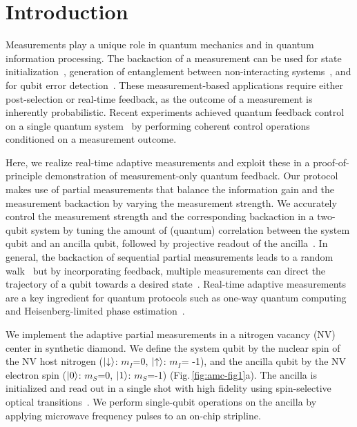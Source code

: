 \section{Introduction}
Measurements play a unique role in quantum mechanics and in quantum information processing. The backaction of a measurement can be used for state initialization~\cite{Robledo_Nature_2011,Riste_PRL_2012}, generation of entanglement between non-interacting systems~\cite{Chou_Nature_2005,Moehring_Nature_2007,Pfaff_NatPhys_2012,Riste_Nature_2013}, and for qubit error detection~\cite{Chiaverini_Nature_2004}. These measurement-based applications require either post-selection or real-time feedback, as the outcome of a measurement is inherently probabilistic. Recent experiments achieved quantum feedback control on a single quantum system~\cite{Riste_Nature_2013, Gillett_PRL_2010,Sayrin_Nature_2011,Vijay_Nature_2012} by performing coherent control operations conditioned on a measurement outcome.

Here, we realize real-time adaptive measurements and exploit these in a proof-of-principle demonstration of measurement-only quantum feedback. Our protocol makes use of partial measurements that balance the information gain and the measurement backaction by varying the measurement strength. We accurately control the measurement strength and the corresponding backaction in a two-qubit system by tuning the amount of (quantum) correlation between the system qubit and an ancilla qubit, followed by projective readout of the ancilla~\cite{Brun_PhysRevA_2008,Groen_PRL_2013}. In general, the backaction of sequential partial measurements leads to a random walk~\cite{Guerlin_Nature_2007,Hatridge_Science_2013,Murch_Nature_2013} but by incorporating feedback, multiple measurements can direct the trajectory of a qubit towards a desired state~\cite{Ashhab_PhysRevA_2010,Wiseman_NatureNV_2011}. Real-time adaptive measurements are a key ingredient for quantum protocols such as one-way quantum computing~\cite{Raussendorf_PRL_2001,Prevedel_Nature_2007} and Heisenberg-limited phase estimation~\cite{Cappellaro_PhysRevA_2012,Higgins_Nature_2007}.

We implement the adaptive partial measurements in a nitrogen vacancy (NV) center in synthetic diamond. We define the system qubit by the nuclear spin of the NV host nitrogen ($\left|\downarrow\right>$: $m_I$=0, $\left|\uparrow\right>$: $m_I$= -1), and the ancilla qubit by the NV electron spin ($\left|0\right>$: $m_S$=0, $\left|1\right>$: $m_S$=-1) (Fig.\,\ref{fig:amc-fig1}a). The ancilla is initialized and read out in a single shot with high fidelity using spin-selective optical transitions~\cite{Robledo_Nature_2011}. We perform single-qubit operations on the ancilla by applying microwave frequency pulses to an on-chip stripline.


